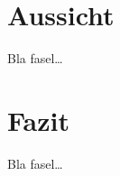 \chapter{Aussicht}
\label{ch:Aussicht}
Bla fasel\ldots

\chapter{Fazit}
\label{ch:Fazit}
Bla fasel\ldots


